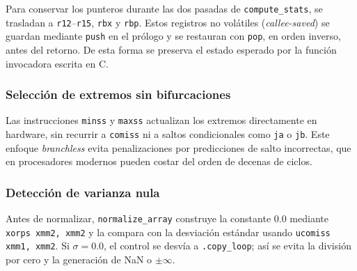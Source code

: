 \documentclass[journal]{IEEEtran}
\begin{document}
Para conservar los punteros durante las dos pasadas de
\texttt{compute\_stats}, se trasladan a \texttt{r12}--\texttt{r15},
\texttt{rbx} y \texttt{rbp}. Estos registros no volátiles
(\textit{callee-saved}) se guardan mediante \texttt{push} en el prólogo y se
restauran con \texttt{pop}, en orden inverso, antes del retorno. De esta forma
se preserva el estado esperado por la función invocadora escrita en C.

\subsubsection{Selección de extremos sin bifurcaciones}

Las instrucciones \texttt{minss} y \texttt{maxss} actualizan los extremos
directamente en hardware, sin recurrir a \texttt{comiss} ni a saltos
condicionales como \texttt{ja} o \texttt{jb}. Este enfoque
\textit{branchless} evita penalizaciones por predicciones de salto incorrectas,
que en procesadores modernos pueden costar del orden de decenas de ciclos.

\subsubsection{Detección de varianza nula}

Antes de normalizar, \texttt{normalize\_array} construye la constante $0.0$
mediante \texttt{xorps xmm2, xmm2} y la compara con la desviación estándar
usando \texttt{ucomiss xmm1, xmm2}. Si $\sigma=0.0$, el control se desvía a
\texttt{.copy\_loop}; así se evita la división por cero y la generación de NaN
o $\pm\infty$.
\end{document}
